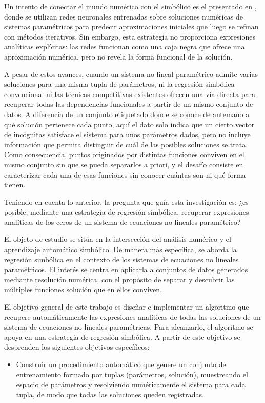 \begin{introduction}
Un intento de conectar el mundo numérico con el simbólico es el presentado en \cite{merlet2024mixing}, donde se utilizan redes neuronales entrenadas sobre soluciones numéricas de sistemas paramétricos para predecir aproximaciones iniciales que luego se refinan con métodos iterativos. Sin embargo, esta estrategia no proporciona expresiones analíticas explícitas: las redes funcionan como una caja negra que ofrece una aproximación numérica, pero no revela la forma funcional de la solución.

A pesar de estos avances, cuando un sistema no lineal paramétrico admite varias soluciones para una misma tupla de parámetros, ni la regresión simbólica convencional ni las técnicas competitivas existentes ofrecen una vía directa para recuperar todas las dependencias funcionales a partir de un mismo conjunto de datos. A diferencia de un conjunto etiquetado donde se conoce de antemano a qué solución pertenece cada punto, aquí el dato solo indica que un cierto vector de incógnitas satisface el sistema para unos parámetros dados, pero no incluye información que permita distinguir de cuál de las posibles soluciones se trata. Como consecuencia, puntos originados por distintas funciones conviven en el mismo conjunto sin que se pueda separarlos a priori, y el desafío consiste en caracterizar cada una de esas funciones sin conocer cuántas son ni qué forma tienen.

Teniendo en cuenta lo anterior, la pregunta que guía esta investigación es: ¿es posible, mediante una estrategia de regresión simbólica, recuperar expresiones analíticas de los ceros de un sistema de ecuaciones no lineales paramétrico?

El objeto de estudio se sitúa en la intersección del análisis numérico y el aprendizaje automático simbólico. De manera más específica, se aborda la regresión simbólica en el contexto de los sistemas de ecuaciones no lineales paramétricos. El interés se centra en aplicarla a conjuntos de datos generados mediante resolución numérica, con el propósito de separar y descubrir las múltiples funciones solución que en ellos conviven.

El objetivo general de este trabajo es diseñar e implementar un algoritmo que recupere automáticamente las expresiones analíticas de todas las soluciones de un sistema de ecuaciones no lineales paramétricas. Para alcanzarlo, el algoritmo se apoya en una estrategia de regresión simbólica. A partir de este objetivo se desprenden los siguientes objetivos específicos:

\begin{itemize}
	\item Construir un procedimiento automático que genere un conjunto de entrenamiento formado por tuplas (parámetros, solución), muestreando el espacio de parámetros y resolviendo numéricamente el sistema para cada tupla, de modo que todas las soluciones queden registradas.


\end{itemize}
\end{introduction}
